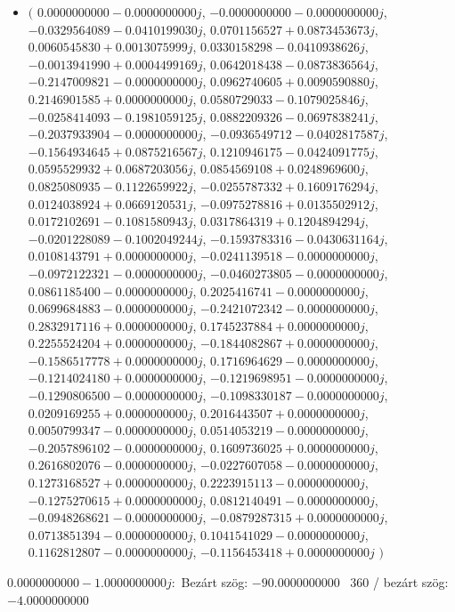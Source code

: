 \documentclass[14pt,a4paper]{article}
\begin{document}
\begin{itemize}
\item
$\big($
$0.0000000000-0.0000000000j$, $-0.0000000000-0.0000000000j$, $-0.0329564089-0.0410199030j$, $0.0701156527+0.0873453673j$, $0.0060545830+0.0013075999j$, $0.0330158298-0.0410938626j$, $-0.0013941990+0.0004499169j$, $0.0642018438-0.0873836564j$, $-0.2147009821-0.0000000000j$, $0.0962740605+0.0090590880j$, $0.2146901585+0.0000000000j$, $0.0580729033-0.1079025846j$, $-0.0258414093-0.1981059125j$, $0.0882209326-0.0697838241j$, $-0.2037933904-0.0000000000j$, $-0.0936549712-0.0402817587j$, $-0.1564934645+0.0875216567j$, $0.1210946175-0.0424091775j$, $0.0595529932+0.0687203056j$, $0.0854569108+0.0248969600j$, $0.0825080935-0.1122659922j$, $-0.0255787332+0.1609176294j$, $0.0124038924+0.0669120531j$, $-0.0975278816+0.0135502912j$, $0.0172102691-0.1081580943j$, $0.0317864319+0.1204894294j$, $-0.0201228089-0.1002049244j$, $-0.1593783316-0.0430631164j$, $0.0108143791+0.0000000000j$, $-0.0241139518-0.0000000000j$, $-0.0972122321-0.0000000000j$, $-0.0460273805-0.0000000000j$, $0.0861185400-0.0000000000j$, $0.2025416741-0.0000000000j$, $0.0699684883-0.0000000000j$, $-0.2421072342-0.0000000000j$, $0.2832917116+0.0000000000j$, $0.1745237884+0.0000000000j$, $0.2255524204+0.0000000000j$, $-0.1844082867+0.0000000000j$, $-0.1586517778+0.0000000000j$, $0.1716964629-0.0000000000j$, $-0.1214024180+0.0000000000j$, $-0.1219698951-0.0000000000j$, $-0.1290806500-0.0000000000j$, $-0.1098330187-0.0000000000j$, $0.0209169255+0.0000000000j$, $0.2016443507+0.0000000000j$, $0.0050799347-0.0000000000j$, $0.0514053219-0.0000000000j$, $-0.2057896102-0.0000000000j$, $0.1609736025+0.0000000000j$, $0.2616802076-0.0000000000j$, $-0.0227607058-0.0000000000j$, $0.1273168527+0.0000000000j$, $0.2223915113-0.0000000000j$, $-0.1275270615+0.0000000000j$, $0.0812140491-0.0000000000j$, $-0.0948268621-0.0000000000j$, $-0.0879287315+0.0000000000j$, $0.0713851394-0.0000000000j$, $0.1041541029-0.0000000000j$, $0.1162812807-0.0000000000j$, $-0.1156453418+0.0000000000j$
$\big)$
\end{itemize}
$0.0000000000-1.0000000000j$:\
Bezárt szög: $-90.0000000000$ \
360 / bezárt szög: $-4.0000000000$\
\end{document}
